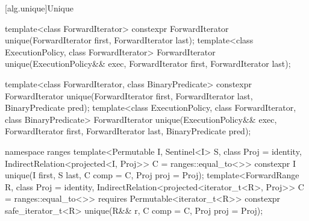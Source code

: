 [alg.unique]{Unique}

%
\begin{itemdecl}
template<class ForwardIterator>
  constexpr ForwardIterator unique(ForwardIterator first, ForwardIterator last);
template<class ExecutionPolicy, class ForwardIterator>
  ForwardIterator unique(ExecutionPolicy&& exec,
                         ForwardIterator first, ForwardIterator last);

template<class ForwardIterator, class BinaryPredicate>
  constexpr ForwardIterator unique(ForwardIterator first, ForwardIterator last,
                                   BinaryPredicate pred);
template<class ExecutionPolicy, class ForwardIterator, class BinaryPredicate>
  ForwardIterator unique(ExecutionPolicy&& exec,
                         ForwardIterator first, ForwardIterator last,
                         BinaryPredicate pred);
\end{itemdecl}
\begin{addedblock}
\begin{itemdecl}
namespace ranges {
  template<Permutable I, Sentinel<I> S, class Proj = identity,
      IndirectRelation<projected<I, Proj>> C = ranges::equal_to<>>
    constexpr I unique(I first, S last, C comp = C{}, Proj proj = Proj{});
  template<ForwardRange R, class Proj = identity,
      IndirectRelation<projected<iterator_t<R>, Proj>> C = ranges::equal_to<>>
    requires Permutable<iterator_t<R>>
    constexpr safe_iterator_t<R>
      unique(R&& r, C comp = C{}, Proj proj = Proj{});
}
\end{itemdecl}
\end{addedblock}

